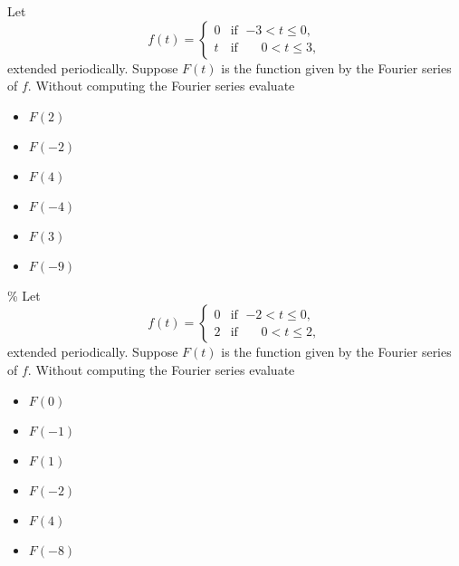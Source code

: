 \documentclass{ximera}
\begin{document}
\begin{exercise}
    Let
    \begin{equation*}
        f(t) =
        \begin{cases}
            0 & \text{if } \; {-3} < t \leq 0, \\
            t & \text{if } \; \phantom{-}0 < t \leq 3,
        \end{cases}
    \end{equation*}
    extended periodically.  Suppose $F(t)$ is the function given by the Fourier series of $f$.  Without computing the Fourier series evaluate
    \begin{itemize}
        \item $F(2)$
        \item $F(-2)$
        \item $F(4)$
        \item $F(-4)$
        \item $F(3)$
        \item $F(-9)$
    \end{itemize}
\end{exercise}

\begin{exercise}\%
    Let
    \begin{equation*}
        f(t) = 
        \begin{cases}
            0 & \text{if } \; {-2} < t \leq 0, \\
            2 & \text{if } \; \phantom{-}0 < t \leq 2,
        \end{cases}
    \end{equation*}
    extended periodically.  Suppose $F(t)$ is the function given by the Fourier series of $f$.  Without computing the Fourier series evaluate
    \begin{itemize}
        \item $F(0)$
        \item $F(-1)$
        \item $F(1)$
        \item $F(-2)$
        \item $F(4)$
        \item $F(-8)$
    \end{itemize}
\end{exercise}

\end{document}

